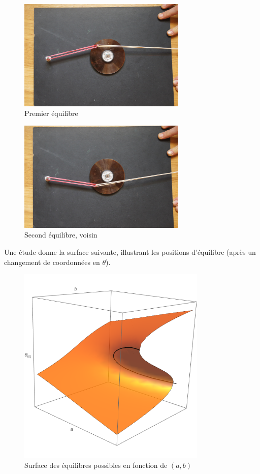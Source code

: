 \documentclass[a4paper]{article}
\theoremstyle{definition}
\begin{document}
\begin{figure}[H]\centering\includegraphics[width=8cm,keepaspectratio]{images/eq_haut_loq.jpg}\caption{Premier équilibre}\end{figure}
\begin{figure}[H]\centering\includegraphics[width=8cm,keepaspectratio]{images/eq_bas_loq.jpg}\caption{Second équilibre, voisin}\end{figure}

Une étude donne la surface suivante, illustrant les positions d'équilibre (après un changement de coordonnées en $\theta$).

\begin{figure}[H]\centering\includegraphics[width=9cm,keepaspectratio]{images/cusp_zeeman.png}\caption{Surface des équilibres possibles en fonction de $(a,b)$}\label{fig:zeemsurf}\end{figure}
\end{document}

